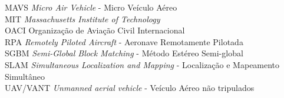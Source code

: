 \begin{tabbing}
\> MAVS  	\> \textit{Micro Air Vehicle} - Micro Veículo Aéreo									\\
\> MIT 	 	\> \textit{Massachusetts Institute of Technology}									\\
\> OACI  	\> Organização de Aviação Civil Internacional 										\\
\> RPA 	 	\> \textit{Remotely Piloted Aircraft} - Aeronave Remotamente Pilotada							\\
\> SGBM  	\> \textit{Semi-Global Block Matching}	- Método Estéreo Semi-global							\\
\> SLAM  	\> \textit{Simultaneous Localization and Mapping} - Localização e Mapeamento Simultâneo					\\
\> UAV/VANT 	\> \textit{Unmanned aerial vehicle} - Veículo Aéreo não tripulados 							\\

\end{tabbing}
\cleardoublepage
\pagestyle{fancy}
\fancyhf{} %
\fancyhead[RO, LE] {\thepage}


\tableofcontents %